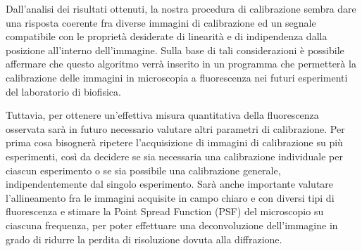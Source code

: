 Dall'analisi dei risultati ottenuti, la nostra procedura di calibrazione sembra dare una risposta coerente fra diverse immagini di calibrazione ed un segnale compatibile con le proprietà desiderate di linearità e di indipendenza dalla posizione all'interno dell'immagine. 
Sulla base di tali considerazioni è possibile affermare che questo algoritmo verrà inserito in un programma che permetterà la calibrazione delle immagini in microscopia a fluorescenza nei futuri esperimenti del laboratorio di biofisica.

Tuttavia, per ottenere un'effettiva misura quantitativa della fluorescenza osservata sarà in futuro necessario valutare altri parametri di calibrazione.
Per prima cosa bisognerà ripetere l'acquisizione di immagini di calibrazione su più esperimenti, così da decidere se sia necessaria una calibrazione individuale per ciascun esperimento o se sia possibile una calibrazione generale, indipendentemente dal singolo esperimento.
Sarà anche importante valutare l'allineamento fra le immagini acquisite in campo chiaro e con diversi tipi di fluorescenza e stimare la Point Spread Function (PSF) del microscopio su ciascuna frequenza, per poter effettuare una deconvoluzione dell'immagine in grado di ridurre la perdita di risoluzione dovuta alla diffrazione.
